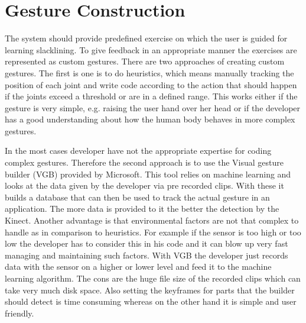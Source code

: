 \section{Gesture Construction}\label{5_2_gestureConstruction}
The system should provide predefined exercise on which the user is guided for learning slacklining. To give feedback in an appropriate manner the exercises are represented as custom gestures. There are two approaches of creating custom gestures. The first is one is to do heuristics, which means manually tracking the position of each joint and write code according to the action that should happen if the joints exceed a threshold or are in a defined range. This works either if the gesture is very simple, e.g. raising the user hand over her head or if the developer has a good understanding about how the human body behaves in more complex gestures. 

In the most cases developer have not the appropriate expertise for coding complex gestures. Therefore the second approach is to use the Visual gesture builder (VGB) provided by Microsoft. This tool relies on machine learning and looks at the data given by the developer via pre recorded clips. With these it builds a database that can then be used to track the actual gesture in an application. The more data is provided to it the better the detection by the Kinect. Another advantage is that environmental factors are not that complex to handle as in comparison to heuristics. For example if the sensor is too high or too low the developer has to consider this in his code and it can blow up very fast managing and maintaining such factors. With VGB the developer just records data with the sensor on a higher or lower level and feed it to the machine learning algorithm. The cons are the huge file size of the recorded clips which can take very much disk space. Also setting the keyframes for parts that the builder should detect is time consuming whereas on the other hand it is simple and user friendly.

